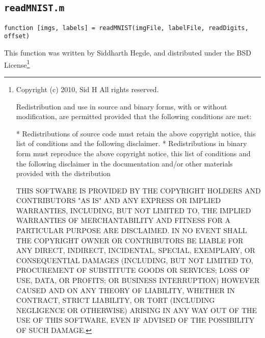 \documentclass[]{article}
\theoremstyle{plain}
\theoremstyle{definition}
\begin{document}
\subsection{\texttt{readMNIST.m}}
\begin{verbatim}
function [imgs, labels] = readMNIST(imgFile, labelFile, readDigits, offset)
\end{verbatim}
\doublespacing
This function was written by Siddharth Hegde, and distributed under the BSD License\footnote{Copyright (c) 2010, Sid H
All rights reserved.

Redistribution and use in source and binary forms, with or without
modification, are permitted provided that the following conditions are
met:

    * Redistributions of source code must retain the above copyright
      notice, this list of conditions and the following disclaimer.
    * Redistributions in binary form must reproduce the above copyright
      notice, this list of conditions and the following disclaimer in
      the documentation and/or other materials provided with the distribution

THIS SOFTWARE IS PROVIDED BY THE COPYRIGHT HOLDERS AND CONTRIBUTORS "AS IS"
AND ANY EXPRESS OR IMPLIED WARRANTIES, INCLUDING, BUT NOT LIMITED TO, THE
IMPLIED WARRANTIES OF MERCHANTABILITY AND FITNESS FOR A PARTICULAR PURPOSE
ARE DISCLAIMED. IN NO EVENT SHALL THE COPYRIGHT OWNER OR CONTRIBUTORS BE
LIABLE FOR ANY DIRECT, INDIRECT, INCIDENTAL, SPECIAL, EXEMPLARY, OR
CONSEQUENTIAL DAMAGES (INCLUDING, BUT NOT LIMITED TO, PROCUREMENT OF
SUBSTITUTE GOODS OR SERVICES; LOSS OF USE, DATA, OR PROFITS; OR BUSINESS
INTERRUPTION) HOWEVER CAUSED AND ON ANY THEORY OF LIABILITY, WHETHER IN
CONTRACT, STRICT LIABILITY, OR TORT (INCLUDING NEGLIGENCE OR OTHERWISE)
ARISING IN ANY WAY OUT OF THE USE OF THIS SOFTWARE, EVEN IF ADVISED OF THE
POSSIBILITY OF SUCH DAMAGE.}
\end{document}

